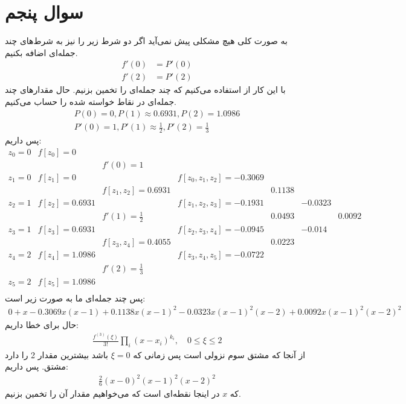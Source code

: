 \documentclass[]{article}
\begin{document}
\section*{سوال پنجم}
به صورت کلی هیچ مشکلی پیش نمی‌آید اگر دو شرط زیر را نیز به شرط‌های چند جمله‌ای اضافه بکنیم.
\begin{align*}
    f'(0) &= P'(0)\\
    f'(2) &= P'(2)
\end{align*}
با این کار از
استفاده می‌کنیم که چند جمله‌ای را تخمین بزنیم.
حال مقدار‌های چند جمله‌ای در نقاط خواسته شده را حساب می‌کنیم.
\begin{gather*}
    P(0) = 0, P(1) \approx 0.6931, P(2) = 1.0986\\
    P'(0) = 1, P'(1) \approx \frac{1}{2}, P'(2) = \frac{1}{3}
\end{gather*}
پس داریم:
\[
\begin{array}{ccccccc}
z_0 = 0 & f[z_0] = 0 \\
&& f'(0) = 1 \\
z_1 = 0 & f[z_1] = 0 && f[z_0,z_1,z_2] = -0.3069\\
&& f[z_1,z_2] = 0.6931 && 0.1138\\
z_2 = 1 & f[z_2] = 0.6931 && f[z_1,z_2,z_3] = -0.1931 && -0.0323\\
&& f'(1) = \frac{1}{2} && 0.0493 && 0.0092\\
z_3 = 1 & f[z_3] = 0.6931 && f[z_2,z_3,z_4] = -0.0945 && -0.014 \\
&& f[z_3,z_4] = 0.4055 && 0.0223 \\
z_4 = 2 & f[z_4] = 1.0986&&f[z_3,z_4,z_5] = -0.0722\\
&&f'(2) = \frac{1}{3}\\
z_5 = 2 & f[z_5] = 1.0986\\
\end{array}
\]
پس چند جمله‌ای ما به صورت زیر است:
\begin{gather*}
    0 + x -0.3069 x (x-1) + 0.1138 x (x-1)^2 -0.0323 x (x-1)^2 (x-2) + 0.0092 x (x-1)^2 (x-2)^2
\end{gather*}
حال برای خطا داریم:
\begin{gather*}
    \frac{f^{(3)}(\xi)}{3!}\prod_i(x - x_i)^{k_i}, \quad 0 \le \xi \le 2
\end{gather*}
از آنجا که مشتق سوم نزولی است پس زمانی که
$\xi = 0$
باشد بیشترین مقدار 2 را دارد مشتق. پس داریم:
\begin{gather*}
    \frac{2}{6} (x - 0)^2 (x - 1)^2 (x - 2)^2 
\end{gather*}
که
$x$
در اینجا نقطه‌‌ای است که می‌خواهیم مقدار آن را تخمین بزنیم.
\end{document}
